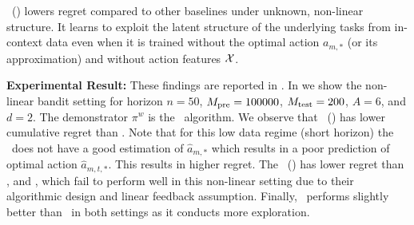 \begin{tcolorbox}
\customfinding \pred\ (\gt)  lowers regret compared to other baselines under unknown, non-linear structure. It learns to exploit the latent structure of the underlying tasks from in-context data even when it is trained without the optimal action $a_{m,*}$ (or its approximation) and without action features $\mathcal{X}$.
\end{tcolorbox}





\textbf{Experimental Result:} These findings are reported in .
%
%
%
%
In  we show the non-linear bandit setting for horizon $n=50$, $M_{\text{pre}} = 100000$, $M_{\text{test}} = 200$, $A=6$, and $d=2$. The demonstrator $\pi^w$ is the \ts\ algorithm. We observe that \pred\ (\gt) has lower cumulative regret than \dptg. 
%
Note that for this low data regime (short horizon) the \dptg\ does not have a good estimation of $\widehat{a}_{m,*}$ which results in a poor prediction of optimal action $\widehat{a}_{m,t,*}$. This results in higher regret.
%
The \pred\ (\gt) has lower regret than \linucb, and \mlin, which fail to perform well in this non-linear setting due to their algorithmic design and linear feedback assumption. Finally, \predt\ performs slightly better than \pred\ in both settings as it conducts more exploration. 
%

